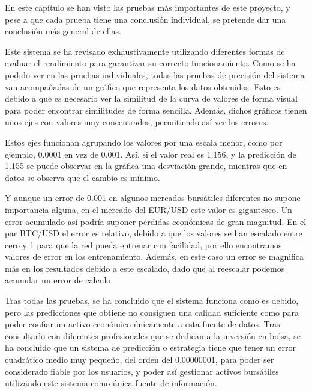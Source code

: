 En este capítulo se han visto las pruebas más importantes de este proyecto, y pese a que cada prueba tiene una conclusión individual, se pretende dar una conclusión más general de ellas.

Este sistema se ha revisado exhaustivamente utilizando diferentes formas de evaluar el rendimiento para garantizar su correcto funcionamiento. Como se ha podido ver en las pruebas individuales, todas las pruebas de precisión del sistema van acompañadas de un gráfico que representa los datos obtenidos. Esto es debido a que es necesario ver la similitud de la curva de valores de forma visual para poder encontrar similitudes de forma sencilla. Además, dichos gráficos tienen unos ejes con valores muy concentrados, permitiendo así ver los errores.

Estos ejes funcionan agrupando los valores por una escala menor, como por ejemplo, 0.0001 en vez de 0.001. Así, si el valor real es 1.156, y la predicción de 1.155 se puede observar en la gráfica una desviación grande, mientras que en datos se observa que el cambio es mínimo.

Y aunque un error de 0.001 en algunos mercados bursátiles diferentes no supone importancia alguna, en el mercado del EUR/USD este valor es gigantesco. Un error acumulado así podría suponer pérdidas económicas de gran magnitud. En el par BTC/USD el error es relativo, debido a que los valores se han escalado entre cero y 1 para que la red pueda entrenar con facilidad, por ello encontramos valores de error en los entrenamiento. Además, en este caso un error se magnifica más en los resultados debido a este escalado, dado que al reescalar podemos acumular un error de calculo.



Tras todas las pruebas, se ha concluido que el sistema funciona como es debido, pero las predicciones que obtiene no consiguen una calidad suficiente como para poder confiar un activo económico únicamente a esta fuente de datos. Tras consultarlo con diferentes profesionales que se dedican a la inversión en bolsa, se ha concluido que un sistema de predicción o estrategia tiene que tener un error cuadrático medio muy pequeño, del orden del 0.00000001, para poder ser considerado fiable por los usuarios, y poder así gestionar activos bursátiles utilizando este sistema como única fuente de información. 


\clearpage

